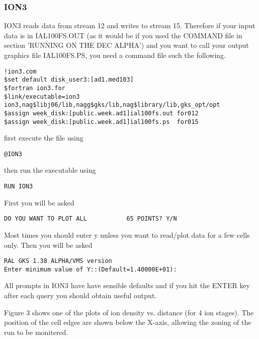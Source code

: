 \subsubsection{ION3}
ION3 reads data from stream 12
and writes to stream 15. 
Therefore if your input data is in
IAL100FS.OUT (as it would be if you used the COMMAND file in section 'RUNNING ON THE DEC ALPHA')
and you want to call your output graphics file IAL100FS.PS,
you need a command file such the following.
\begin{verbatim}
!ion3.com
$set default disk_user3:[ad1.med103]
$fortran ion3.for
$link/executable=ion3 ion3,nag$libj06/lib,nagg$gks/lib,nag$library/lib,gks_opt/opt
$assign week_disk:[public.week.ad1]ial100fs.out for012
$assign week_disk:[public.week.ad1]ial100fs.ps  for015
\end{verbatim}
first execute the file using
\begin{verbatim}
@ION3
\end{verbatim}
then run the executable using
\begin{verbatim}
RUN ION3
\end{verbatim}
First you will be asked
\begin{verbatim}
DO YOU WANT TO PLOT ALL           65 POINTS? Y/N
\end{verbatim}
Most times you should enter y unless you want to read/plot data
for a few cells only. Then you will be asked
\begin{verbatim}
RAL GKS 1.38 ALPHA/VMS version
Enter minimum value of Y::(Default=1.40000E+01):
\end{verbatim}
All prompts in ION3 have have sensible defaults and if you hit the ENTER key after each query you should 
obtain useful output.

Figure 3 shows one of the plots of ion density vs. distance (for 4 ion stages). The position of the cell edges
are shown below the X-axis, allowing the zoning of the run to be monitered.


